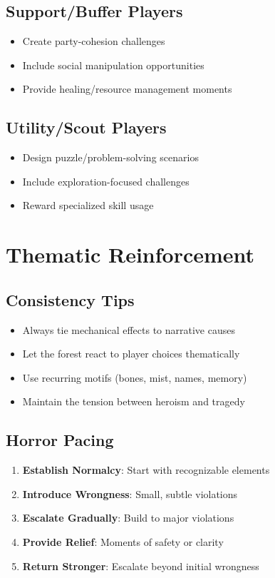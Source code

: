 \documentclass[11pt]{article}
\begin{document}
\subsection{Support/Buffer Players}
\begin{itemize}
    \item Create party-cohesion challenges
    \item Include social manipulation opportunities
    \item Provide healing/resource management moments
\end{itemize}

\subsection{Utility/Scout Players}
\begin{itemize}
    \item Design puzzle/problem-solving scenarios
    \item Include exploration-focused challenges
    \item Reward specialized skill usage
\end{itemize}

\section{Thematic Reinforcement}

\subsection{Consistency Tips}
\begin{itemize}
    \item Always tie mechanical effects to narrative causes
    \item Let the forest react to player choices thematically
    \item Use recurring motifs (bones, mist, names, memory)
    \item Maintain the tension between heroism and tragedy
\end{itemize}

\subsection{Horror Pacing}
\begin{enumerate}
    \item \textbf{Establish Normalcy}: Start with recognizable elements
    \item \textbf{Introduce Wrongness}: Small, subtle violations
    \item \textbf{Escalate Gradually}: Build to major violations
    \item \textbf{Provide Relief}: Moments of safety or clarity
    \item \textbf{Return Stronger}: Escalate beyond initial wrongness
\end{enumerate}
\end{document}
